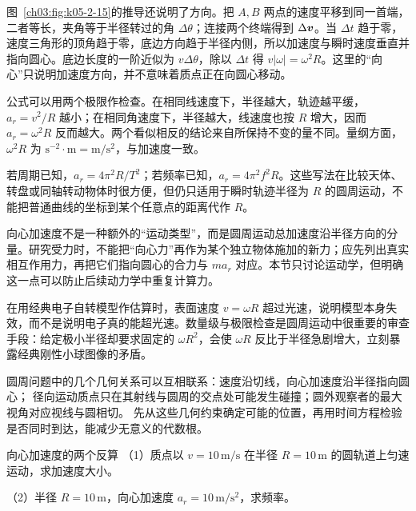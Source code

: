 {图~\ref{ch03:fig:k05-2-15}的推导还说明了方向。把 $A,B$ 两点的速度平移到同一首端，二者等长，夹角等于半径转过的角 $\Delta\theta$；连接两个终端得到 $\Delta\bm{v}$。当 $\Delta t$ 趋于零，速度三角形的顶角趋于零，底边方向趋于半径内侧，所以加速度与瞬时速度垂直并指向圆心。底边长度的一阶近似为 $v\Delta\theta$，除以 $\Delta t$ 得 $v|\omega|=\omega^2R$。这里的“向心”只说明加速度方向，并不意味着质点正在向圆心移动。

公式可以用两个极限作检查。在相同线速度下，半径越大，轨迹越平缓，$a_r=v^2/R$ 越小；在相同角速度下，半径越大，线速度也按 $R$ 增大，因而 $a_r=\omega^2R$ 反而越大。两个看似相反的结论来自所保持不变的量不同。量纲方面，$\omega^2R$ 为 $\mathrm{s^{-2}}\cdot\mathrm m=\mathrm{m/s^2}$，与加速度一致。

若周期已知，$a_r=4\pi^2R/T^2$；若频率已知，$a_r=4\pi^2f^2R$。这些写法在比较天体、转盘或同轴转动物体时很方便，但仍只适用于瞬时轨迹半径为 $R$ 的圆周运动，不能把普通曲线的坐标到某个任意点的距离代作 $R$。

向心加速度不是一种额外的“运动类型”，而是圆周运动总加速度沿半径方向的分量。研究受力时，不能把“向心力”再作为某个独立物体施加的新力；应先列出真实相互作用力，再把它们指向圆心的合力与 $ma_r$ 对应。本节只讨论运动学，但明确这一点可以防止后续动力学中重复计算力。

在用经典电子自转模型作估算时，表面速度 $v=\omega R$ 超过光速，说明模型本身失效，而不是说明电子真的能超光速。数量级与极限检查是圆周运动中很重要的审查手段：给定极小半径却要求固定的 $\omega R^2$，会使 $\omega R$ 反比于半径急剧增大，立刻暴露经典刚性小球图像的矛盾。

圆周问题中的几个几何关系可以互相联系：速度沿切线，向心加速度沿半径指向圆心；
径向运动质点只在其射线与圆周的交点处可能发生碰撞；圆外观察者的最大视角对应视线与圆相切。
先从这些几何约束确定可能的位置，再用时间方程检验是否同时到达，能减少无意义的代数根。

\begin{origexamplebox}{向心加速度的两个反算}\label{ch03:ex:k05-2-54}
（1）质点以 $v=10\,\mathrm{m/s}$ 在半径 $R=10\,\mathrm m$ 的圆轨道上匀速运动，求加速度大小。\par
（2）半径 $R=10\,\mathrm m$，向心加速度 $a_r=10\,\mathrm{m/s^2}$，求频率。


\end{origexamplebox}}
